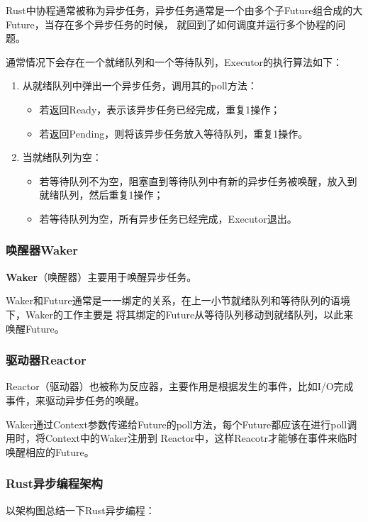 \documentclass[supercite]{HustGraduPaper}
\theoremstyle{definition}
\begin{document}
Rust中协程通常被称为异步任务，异步任务通常是一个由多个子Future组合成的大Future，当存在多个异步任务的时候，
就回到了如何调度并运行多个协程的问题。\par

通常情况下会存在一个就绪队列和一个等待队列，Executor的执行算法如下：
\begin{enumerate}
  \item 从就绪队列中弹出一个异步任务，调用其的poll方法：
    \begin{itemize}
      \item 若返回Ready，表示该异步任务已经完成，重复1操作；
      \item 若返回Pending，则将该异步任务放入等待队列，重复1操作。
    \end{itemize}
  \item 当就绪队列为空：
    \begin{itemize}
      \item 若等待队列不为空，阻塞直到等待队列中有新的异步任务被唤醒，放入到就绪队列，然后重复1操作；
      \item 若等待队列为空，所有异步任务已经完成，Executor退出。
    \end{itemize}
\end{enumerate}

\subsubsection{唤醒器Waker}
\textbf{Waker}（唤醒器）主要用于唤醒异步任务。\par

Waker和Future通常是一一绑定的关系，在上一小节就绪队列和等待队列的语境下，Waker的工作主要是
将其绑定的Future从等待队列移动到就绪队列，以此来唤醒Future。\par

\subsubsection{驱动器Reactor}
Reactor（驱动器）也被称为反应器，主要作用是根据发生的事件，比如I/O完成事件，来驱动异步任务的唤醒。\par

Waker通过Context参数传递给Future的poll方法，每个Future都应该在进行poll调用时，将Context中的Waker注册到
Reactor中，这样Reacotr才能够在事件来临时唤醒相应的Future。\par

\subsubsection{Rust异步编程架构}
以架构图总结一下Rust异步编程：
\end{document}
